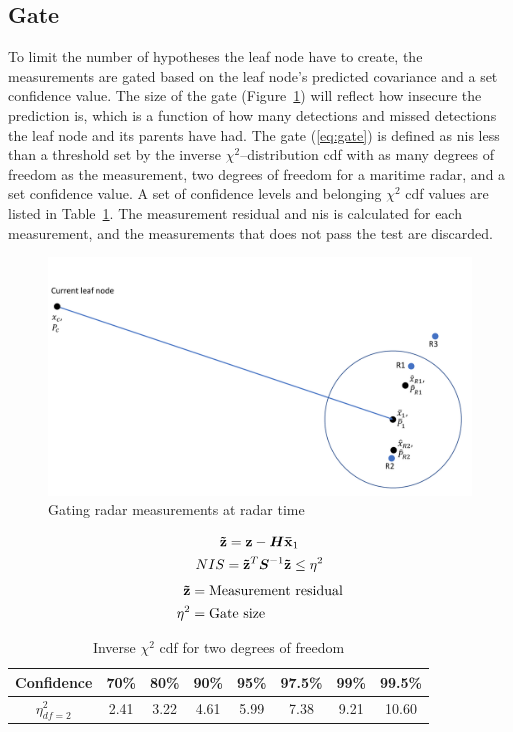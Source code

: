 \subsection{Gate}
To limit the number of hypotheses the leaf node have to create, the measurements are gated based on the leaf node's predicted covariance and a set confidence value. The size of the gate (Figure~\ref{fig:gating_radar_at_radar_time}) will reflect how insecure the prediction is, which is a function of how many detections and missed detections the leaf node and its parents have had. The gate (\ref{eq:gate}) is defined as \gls{nis} less than a threshold set by the inverse \(\chi^2\)--distribution \gls{cdf} with as many degrees of freedom as the measurement, two degrees of freedom for a maritime radar, and a set confidence value. A set of confidence levels and belonging \(\chi^2\) \gls{cdf} values are listed in Table~\ref{tab:chi_square}. The measurement residual and \gls{nis} is calculated for each measurement, and the measurements that does not pass the test are discarded.
\begin{figure}
\centering
\includegraphics[width = .8\textwidth]{Figures/radar_gating.pdf}
\caption{Gating radar measurements at radar time}\label{fig:gating_radar_at_radar_time}
\end{figure}
\begin{equation}\label{eq:gate}
\begin{gathered}
\boldsymbol{\mathbf{\tilde{z}}} = \boldsymbol{\mathbf{z}} - \bm{H}\boldsymbol{\mathbf{\bar{x}}}_1 \\
NIS = \boldsymbol{\mathbf{\tilde{z}}}^T	\bm{S}^{-1} \boldsymbol{\mathbf{\tilde{z}}} \leq \eta^2
\end{gathered}
\end{equation}
\begin{equation*}
\begin{split}
\boldsymbol{\mathbf{\tilde{z}}}	&= \text{Measurement residual} \\
\eta^2 			&= \text{Gate size} \\
\end{split}
\end{equation*}
\begin{table}
\centering
\begin{tabular}{c c c c c c c c}
Confidence 	& 70\% 	& 80\% 	& 90\% 	& 95\% 	& 97.5\% 	& 99\% 	& 99.5\% \\ 
\midrule
\(\eta^2_{df=2}\) 	& 2.41 	& 3.22 	& 4.61 	& 5.99 	& 7.38 		& 9.21 	& 10.60
\end{tabular}\caption{Inverse \(\chi^2\) \gls{cdf} for two degrees of freedom}
~\label{tab:chi_square}
\end{table}

